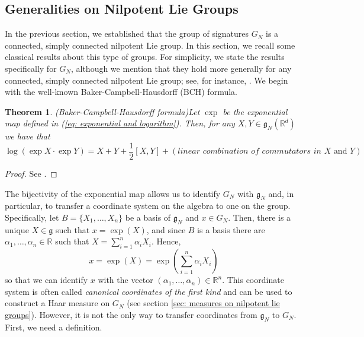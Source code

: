 \documentclass[pdflatex,sn-mathphys-num]{sn-jnl}
\theoremstyle{thmstyletwo}
\theoremstyle{thmstyleone}
\newtheorem{theorem}[definition]{Theorem}
\theoremstyle{thmstyletwo}
\newcommand{\fancyg}{\mathfrak{g}}
\newcommand{\R}{\mathbb{R}}
\begin{document}
	\subsection{Generalities on Nilpotent Lie Groups}
	In the previous section, we established that the group of signatures $G_N$ is a connected, simply connected nilpotent Lie group. In this section, we recall some classical results about this type of groups. For simplicity, we state the results specifically for $G_N$, although we mention that they hold more generally for any connected, simply connected nilpotent Lie group; see, for instance, \cite{corwin1990representations}. We begin with the well-known Baker-Campbell-Hausdorff (BCH) formula.
	\begin{theorem}{(Baker-Campbell-Hausdorff formula)}\label{thm: cbh}
		Let $\exp$ be the exponential map defined in (\ref{eq: exponential and logarithm}). Then, for any $X,Y \in \mathfrak g_N(\R^d)$ we have that
		\begin{equation*}
			\log \left(\exp X \cdot \exp Y \right) = X+Y+\frac{1}{2}[X,Y]+ (\textit{linear combination of commutators in } X \text{ and } Y)
		\end{equation*}
	\end{theorem}
	\begin{proof}
		See \cite[Theorem~1.2.1]{corwin1990representations}.
	\end{proof}
	The bijectivity of the exponential map allows us to identify $G_N$ with $\fancyg_N$ and, in particular, to transfer a coordinate system on the algebra to one on the group. Specifically, let $B = \{X_1, \ldots, X_n\}$ be a basis of $\fancyg_N$ and $x \in G_N$. Then, there is a unique $X \in \fancyg$ such that $x = \exp(X)$, and since $B$ is a basis there are $\alpha_1, \dots, \alpha_n \in \mathbb{R}$ such that $X = \sum_{i=1}^n\alpha_iX_i$. Hence,
	\begin{equation*}
		x = \exp(X) = \exp\left(\sum_{i=1}^n\alpha_iX_i\right)
	\end{equation*}
	so that we can identify $x$ with the vector $(\alpha_1, \ldots, \alpha_n) \in \mathbb{R}^n$. This coordinate system is often called \textit{canonical coordinates of the first kind} and can be used to construct a Haar measure on $G_N$ (see section \ref{sec: measures on nilpotent lie groups}). However, it is not the only way to transfer coordinates from $\fancyg_N$ to $G_N$. First, we need a definition.
\end{document}
